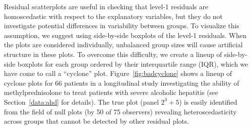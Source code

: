 \documentclass[12pt]{article} %
\newcommand{\hh}[1]{{\color{orange} #1}}
\newcommand{\hhnote}[1]{\todo[inline,color=orange!40]{#1}}
\newcommand{\var}{\ensuremath{\mathrm{Var}}}
\begin{document}


Residual scatterplots are useful in checking that level-1 residuals are homoscedastic with respect to the explanatory variables, but they do not investigate potential differences in variability between groups. To visualize this assumption, we suggest using side-by-side boxplots of the level-1 residuals. When the plots are considered individually, unbalanced group sizes will cause artificial structure in these plots. 
To overcome this difficulty, we create a lineup of side-by-side boxplots for each group ordered by their interquartile range (IQR), which we have come to call a ``cyclone'' plot. Figure~\ref{fig:badcyclone} shows a lineup of cyclone plots for 66 patients in a longitudinal study investigating the ability of methylprednisolone to treat patients with severe alcoholic hepatitis (see Section~\ref{data:ahd} for details). The true plot (panel $2^3+5$) is easily identified from the field of null plots (by 50 of 75 observers) revealing heteroscedasticity across groups that cannot be detected by other residual plots. 
\end{document}
